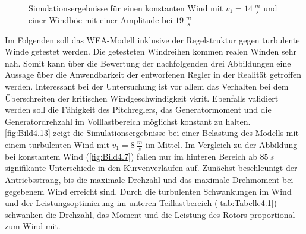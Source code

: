 \begin{figure}[H]
   \centering
   \caption[Windböensimulation bei schnellem Wind]{Simulationsergebnisse für einen konstanten Wind mit $v_1 = \SI{14}{\frac{m}{s}}$ und einer Windböe mit einer Amplitude bei $\SI{19}{\frac{m}{s}}$}
   \label{fig:Bild4.12}
\end{figure}


Im Folgenden soll das WEA-Modell inklusive der Regelstruktur gegen turbulente Winde getestet werden. Die getesteten Windreihen kommen realen Winden sehr nah. Somit kann über die Bewertung der nachfolgenden drei Abbildungen eine Aussage über die Anwendbarkeit der entworfenen Regler in der Realität getroffen werden. Interessant bei der Untersuchung ist vor allem das Verhalten bei dem Überschreiten der kritischen Windgeschwindigkeit \acs{vkrit}. Ebenfalls validiert werden soll die Fähigkeit des Pitchreglers, das Generatormoment und die Generatordrehzahl im Volllastbereich möglichst konstant zu halten.\\
\autoref{fig:Bild4.13} zeigt die Simulationsergebnisse bei einer Belastung des Modells mit einem turbulenten Wind mit $v_1 = \SI{8}{\frac{m}{s}}$ im Mittel. Im Vergleich zu der Abbildung bei konstantem Wind (\autoref{fig:Bild4.7}) fallen nur im hinteren Bereich ab \ca $\SI{85}{s}$ signifikante Unterschiede in den Kurvenverläufen auf. Zunächst beschleunigt der Antriebsstrang, bis die maximale Drehzahl und das maximale Drehmoment bei gegebenem Wind erreicht sind. Durch die turbulenten Schwankungen im Wind und der Leistungsoptimierung im unteren Teillastbereich (\vgl \autoref{tab:Tabelle4.1}) schwanken die Drehzahl, das Moment und die Leistung des Rotors proportional zum Wind mit. 


